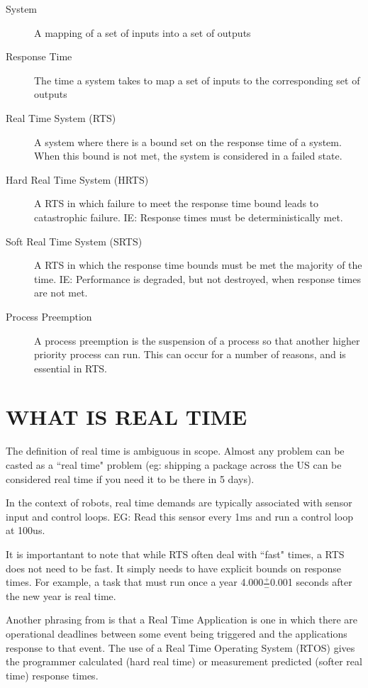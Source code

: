 \documentclass{article}
\begin{document}
\begin{description}
    \item[System]{A mapping of a set of inputs into a set of outputs}
    \item[Response Time]{The time a system takes to map a set of inputs to the corresponding set of outputs}
    \item[Real Time System (RTS)]{A system where there is a bound set on the response time of a system.  When this bound is not met, the system is considered in a failed state.}
    \item[Hard Real Time System (HRTS)]{A RTS in which failure to meet the response time bound leads to catastrophic failure.  IE: Response times must be deterministically met.}
    \item[Soft Real Time System (SRTS)]{A RTS in which the response time bounds must be met the majority of the time. IE: Performance is degraded, but not destroyed, when response times are not met.}
    \item[Process Preemption]{A process preemption is the suspension of a process so that another higher priority process can run.  This can occur for a number of reasons, and is essential in RTS.}
\end{description}

\section{WHAT IS REAL TIME}
The definition of real time is ambiguous in scope.  Almost any problem can be casted as a ``real time" problem (eg: shipping a package across the US can be considered real time if you need it to be there in 5 days).  

In the context of robots, real time demands are typically associated with sensor input and control loops.  EG: Read this sensor every 1ms and run a control loop at 100us.

It is importantant to note that while RTS often deal with ``fast" times, a RTS does not need to be fast.  It simply needs to have explicit bounds on response times.  For example, a task that must run once a year 4.000$\frac{+}{-}$0.001 seconds after the new year is real time.

Another phrasing from \cite{RealTimeLinux} is that a Real Time Application is one in which there are operational deadlines between some event being triggered and the applications response to that event.  The use of a Real Time Operating System (RTOS) gives the programmer calculated (hard real time) or measurement predicted (softer real time) response times.
\end{document}

